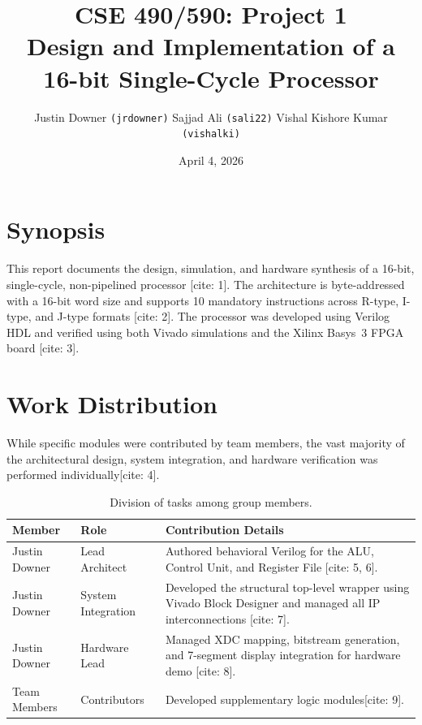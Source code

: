 \documentclass[12pt]{article}
\title{CSE 490/590: Project 1 \\[0.5em]
       \large Design and Implementation of a 16-bit Single-Cycle Processor}
\author{
    \small
    Justin Downer \texttt{(jrdowner)} \quad
    Sajjad Ali \texttt{(sali22)} \quad
    Vishal Kishore Kumar \texttt{(vishalki)}
}
\date{April 4, 2026}
\begin{document}
\maketitle

\section{Synopsis}
This report documents the design, simulation, and hardware synthesis of a 16-bit,
single-cycle, non-pipelined processor \cite{patterson2020}[cite: 1]. The architecture is
byte-addressed with a 16-bit word size and supports 10 mandatory instructions across
R-type, I-type, and J-type formats \cite{patterson2020}[cite: 2]. The processor was developed
using Verilog HDL and verified using both Vivado simulations and the Xilinx Basys~3
FPGA board \cite{digilent2026, xilinx2026}[cite: 3].

\section{Work Distribution}
While specific modules were contributed by team members, the vast majority of the
architectural design, system integration, and hardware verification was performed
individually[cite: 4].

\begin{table}[h]
  \centering
  \caption{Division of tasks among group members.}
  \label{tab:work-distribution}
  \begin{tabular}{@{}l l p{7.8cm}@{}}
    \toprule
    \textbf{Member} & \textbf{Role} & \textbf{Contribution Details} \\
    \midrule
    Justin Downer & Lead Architect
      & Authored behavioral Verilog for the ALU, Control Unit, and Register
        File \cite{patterson2020}[cite: 5, 6]. \\[4pt]
    Justin Downer & System Integration
      & Developed the structural top-level wrapper using Vivado Block Designer
        and managed all IP interconnections \cite{xilinx2026}[cite: 7]. \\[4pt]
    Justin Downer & Hardware Lead
      & Managed XDC mapping, bitstream generation, and 7-segment display
        integration for hardware demo \cite{digilent2026}[cite: 8]. \\[4pt]
    Team Members  & Contributors
      & Developed supplementary logic modules[cite: 9]. \\
    \bottomrule
  \end{tabular}
\end{table}
\end{document}
